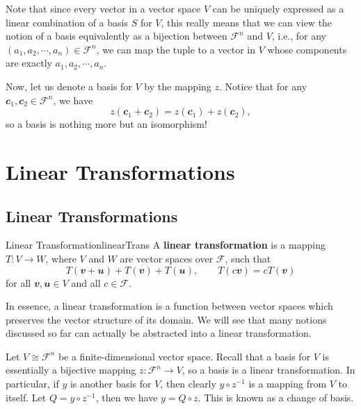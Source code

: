 \documentclass[math, code]{amznotes}
\theoremstyle{remark}
\begin{document}
Note that since every vector in a vector space $V$ can be uniquely expressed as a linear combination of a basis $S$ for $V$, this really means that we can view the notion of a basis equivalently as a bijection between $\mathcal{F}^n$ and $V$, i.e., for any $(a_1, a_2, \cdots, a_n) \in \mathcal{F}^n$, we can map the tuple to a vector in $V$ whose components are exactly $a_1, a_2, \cdots, a_n$.

Now, let us denote a basis for $V$ by the mapping $z$. Notice that for any $\mathbfit{c}_1, \mathbfit{c}_2 \in \mathcal{F}^n$, we have 
\begin{equation*}
    z(\mathbfit{c}_1 + \mathbfit{c}_2) = z(\mathbfit{c}_1) + z(\mathbfit{c}_2),
\end{equation*}
so a basis is nothing more but an isomorphism!

\chapter{Linear Transformations}
\section{Linear Transformations}
\begin{dfnbox}{Linear Transformation}{linearTrans}
    A {\color{red} \textbf{linear transformation}} is a mapping $T \colon V \to W$, where $V$ and $W$ are vector spaces over $\mathcal{F}$, such that
    \begin{equation*}
        T(\mathbfit{v + u}) + T(\mathbfit{v}) + T(\mathbfit{u}), \qquad T(c\mathbfit{v}) = cT(\mathbfit{v})
    \end{equation*}
    for all $\mathbfit{v}, \mathbfit{u} \in V$ and all $c \in \mathcal{F}$.
\end{dfnbox}
In essence, a linear transformation is a function between vector spaces which preserves the vector structure of its domain. We will see that many notions discussed so far can actually be abstracted into a linear transformation.

Let $V \cong \mathcal{F}^n$ be a finite-dimensional vector space. Recall that a basis for $V$ is essentially a bijective mapping $z \colon \mathcal{F}^n \to V$, so a basis is a linear transformation. In particular, if $y$ is another basis for $V$, then clearly $y \circ z^{-1}$ is a mapping from $V$ to itself. Let $Q = y \circ z^{-1}$, then we have $y = Q \circ z$. This is known as a change of basis.
\end{document}
